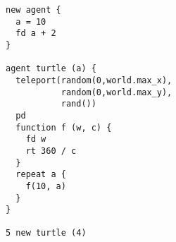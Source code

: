 \begin{frame}[fragile]
	\small
	\begin{lstlisting}[language=Stibbons]
new agent {
  a = 10
  fd a + 2
}

agent turtle (a) {
  teleport(random(0,world.max_x),
           random(0,world.max_y),
           rand())
  pd
  function f (w, c) {
    fd w
    rt 360 / c
  }
  repeat a {
    f(10, a)
  }
}

5 new turtle (4)
	\end{lstlisting}
\end{frame}

